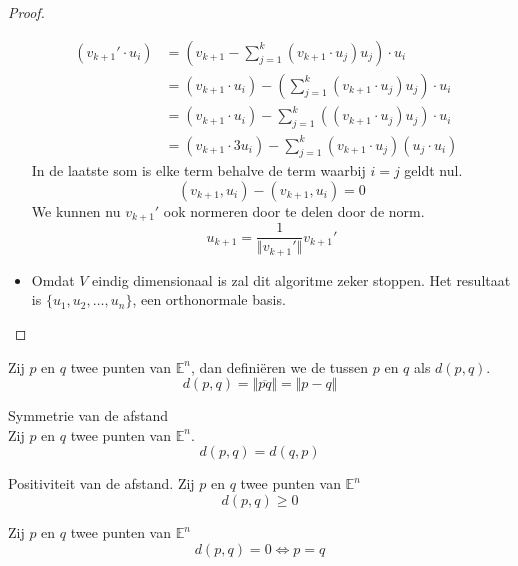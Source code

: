 \documentclass[main.tex]{subfiles}
\begin{document}
\begin{st}
\begin{proof}
\begin{itemize}
      \[
      \begin{array}{rll}
        (v_{k+1}' \cdot u_i) &= \left( v_{k+1} - \sum_{j=1}^k (v_{k+1} \cdot u_j)u_j\right) \cdot u_i &\\
                            &= (v_{k+1} \cdot u_i) - \left( \sum_{j=1}^k (v_{k+1} \cdot u_j)u_j\right) \cdot u_{i} &\\
                            &= (v_{k+1} \cdot u_i) - \sum_{j=1}^k \left((v_{k+1} \cdot u_j) u_j \right) \cdot u_i &\\
                            &= ( v_{k+1} \cdot 3u_i ) - \sum_{j=1}^k (v_{k+1} \cdot u_j ) ( u_j \cdot u_i)
      \end{array}
      \]
      In de laatste som is elke term behalve de term waarbij $i=j$ geldt nul.
      \[
      (v_{k+1},u_i) - (v_{k+1},u_i) = 0
      \]
      We kunnen nu $v_{k+1}'$ ook normeren door te delen door de norm.
      \[
      u_{k+1} = \frac{1}{\Vert v_{k+1}'\Vert}v_{k+1}'
      \]
    \item
      Omdat $V$ eindig dimensionaal is zal dit algoritme zeker stoppen. Het resultaat is $\{u_1,u_2,\ldots,u_n\}$, een orthonormale basis.
    \end{itemize}
  \end{proof}
\end{st}

\begin{de}
  Zij $p$ en $q$ twee punten van $\mathbb{E}^{n}$, dan defini\"eren we de  tussen $p$ en $q$ als $d(p,q)$.
  \[ d(p,q) = \Vert \overline{pq} \Vert = \Vert p-q \Vert \]
\end{de}

\begin{ei}
  \label{ei:symmetrie-afstand}
  Symmetrie van de afstand\\
  Zij $p$ en $q$ twee punten van $\mathbb{E}^{n}$.
  \[ d(p,q) = d(q,p) \]
\end{ei}

\begin{ei}
  \label{ei:afstand-positief}
  Positiviteit van de afstand.
  Zij $p$ en $q$ twee punten van $\mathbb{E}^{n}$
  \[ d(p,q) \ge 0 \]
\end{ei}

\begin{ei}
  \label{ei:afstand-nul-gelijk}
  Zij $p$ en $q$ twee punten van $\mathbb{E}^{n}$
  \[ d(p,q) = 0 \Leftrightarrow p = q \]
\end{ei}
\end{document}
